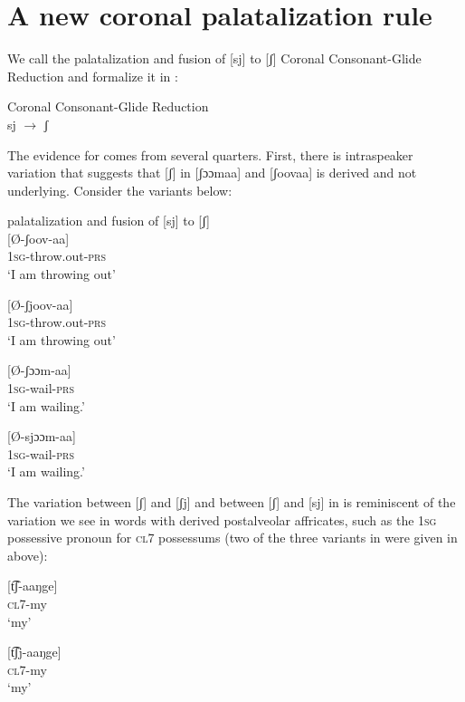 \documentclass[output=paper]{langsci/langscibook}
\begin{document}
\section{A new coronal palatalization rule}

We call the palatalization and fusion of [sj] to [ʃ] Coronal Consonant-Glide Reduction and formalize it in :


\ea\label{ex:glewwe:24}{}
 Coronal Consonant-Glide Reduction\\
 sj $\rightarrow$ ʃ\\{}
\z

The evidence for  comes from several quarters. First, there is intraspeaker variation that suggests that [ʃ] in [ʃɔɔmaa] and [ʃoovaa] is derived and not underlying. Consider the variants below:
 
\ea\label{ex:glewwe:25}{}
{palatalization and fusion of [sj] to [ʃ]} \\
   \ea\label{ex:glewwe:25a}
 [Ø-ʃoov-aa]\\{}
\textsc{1sg}-throw.out-\textsc{prs}\\{}
\glt ‘I am throwing out’

\ex\label{ex:glewwe:25b}{}
 [Ø-ʃjoov-aa]\\{}
\textsc{1sg}-throw.out-\textsc{prs}\\{}
\glt ‘I am throwing out’

\ex\label{ex:glewwe:25c}{}
 [Ø-ʃɔɔm-aa]\\{}
\textsc{1sg}-wail-\textsc{prs}\\{}
\textsc{‘I} am wailing.’

\ex\label{ex:glewwe:25d}{}
 [Ø-sjɔɔm-aa]\\{}
\textsc{1sg}-wail-\textsc{prs}\\{}
\glt ‘I am wailing.’
\z 
\z 

The variation between [ʃ] and [ʃj] and between [ʃ] and [sj] in  is reminiscent of the variation we see in words with derived postalveolar affricates, such as the 1\textsc{sg} possessive pronoun for \textsc{cl}7 possessums (two of the three variants in  were given in  above):

\ea\label{ex:glewwe:26}{}
   \ea\label{ex:glewwe:26a}
 [t͡ʃ-aaŋge]\\{}
\textsc{cl7}-my\\{}
\glt ‘my’

\ex\label{ex:glewwe:26b}{}
 [t͡ʃj-aaŋge]\\{}
\textsc{cl7}-my\\{}
\glt ‘my’
\end{document}
